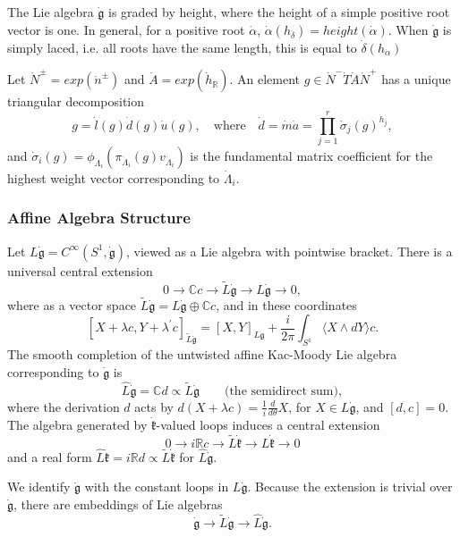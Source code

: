 \documentclass{amsart}
\theoremstyle{conjecture}
\theoremstyle{definition}
\theoremstyle{question}
\theoremstyle{questions}
\theoremstyle{remark}
\theoremstyle{remarks}
\theoremstyle{example}
\numberwithin{equation}{section}
\begin{document}
The Lie algebra $\dot{\mathfrak g}$ is graded by height, where the height of a simple positive root vector
is one. In general, for a positive root
$\dot{\alpha}$,
$\dot{\alpha}(h_{\dot{\delta}})=height(\dot{\alpha})$. When $\dot {\mathfrak g}$ is simply laced,
 i.e. all roots have the same length, this is equal to $\dot \delta(h_{\dot \alpha})$

Let $\dot N^{\pm}=exp(\dot n^{\pm})$ and $\dot A=exp(\dot
h_{\mathbb R})$. An element $g\in \dot N^-\dot T\dot A\dot N^+$
has a unique triangular decomposition
\begin{equation}\label{finitefactorization}g=\dot l(g) \dot d(g) \dot u(g), \quad \text{where} \quad
\dot d=\dot m \dot a=\prod_{j=1}^r \dot {\sigma}_j(g)^{\dot
h_j},\end{equation} and $\dot
{\sigma}_i(g)=\phi_{\dot{\Lambda}_i}(\pi_{\dot {\Lambda}_i}(g)
v_{\dot{\Lambda}_i})$ is the fundamental matrix coefficient for
the highest weight vector corresponding to $\dot {\Lambda}_i$.


\subsubsection{Affine Algebra Structure}

Let $L\dot{\mathfrak g}=C^{\infty}(S^1,\dot{\mathfrak g})$, viewed
as a Lie algebra with pointwise bracket. There is a universal
central extension
\[0\to \mathbb C c\to\tilde {L}\dot {\mathfrak g}\to L\dot {\mathfrak g}\to 0,\]
where as a vector space $\tilde {L}\dot {\mathfrak g}=L\dot
{\mathfrak g}\oplus \mathbb C c$, and in these coordinates
\begin{equation}\label{bracket}[X+\lambda c,Y+\lambda^{\prime} c]_{\tilde {L}\dot {\mathfrak g}}
=[X,Y]_{L\dot {\mathfrak g}}+\frac i{2\pi}\int_{S^1}\langle
X\wedge dY\rangle c. \end{equation} The smooth completion of the
untwisted affine Kac-Moody Lie algebra corresponding to
$\dot{\mathfrak g}$ is
$$\widehat L\dot{\mathfrak g}=\mathbb C d\propto\tilde {L}\dot {\mathfrak g}
\qquad \text{(the semidirect sum)},$$ where the derivation $d$
acts by $d(X+\lambda c)=\frac 1i\frac d{d\theta}X$, for $X\in
L\dot {\mathfrak g}$, and $[d,c]=0$. The algebra generated by
$\dot {\mathfrak k}$-valued loops induces a central extension
\[0\to i\mathbb R c\to\tilde {L}\dot {\mathfrak k}\to L\dot {\mathfrak k}\to 0 \]
and a real form $\widehat L\dot{\mathfrak k}=i\mathbb R d\propto\tilde
{L}\dot {\mathfrak k}$ for $\widehat L\dot{\mathfrak g}$.

We identify $\dot {\mathfrak g}$ with the constant loops in $L\dot
{\mathfrak g}$. Because the extension is trivial over $\dot
{\mathfrak g}$, there are embeddings of Lie algebras
\[\dot {\mathfrak g}\to\tilde {L}\dot {\mathfrak g}\to \widehat L\dot{\mathfrak g}. \]
\end{document}
